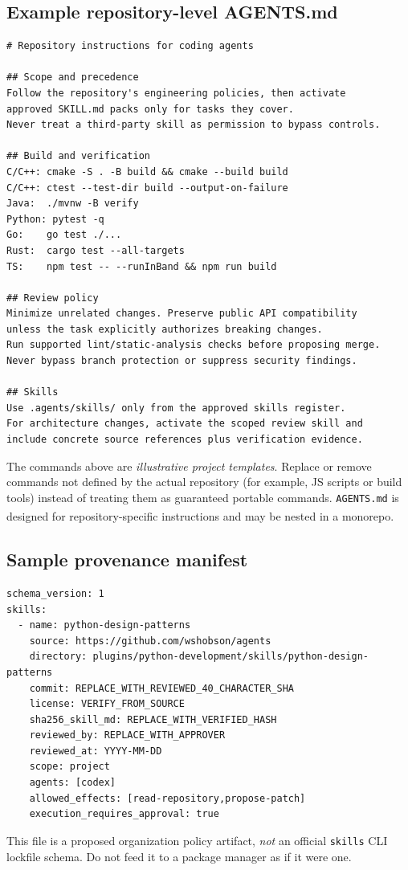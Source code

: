 \documentclass[11pt,letterpaper]{article}
\newcommand{\src}[1]{\textsuperscript{\textcolor{teal}{\cite{#1}}}}
\begin{document}
\subsection{Example repository-level AGENTS.md}
\begin{verbatim}
# Repository instructions for coding agents

## Scope and precedence
Follow the repository's engineering policies, then activate
approved SKILL.md packs only for tasks they cover.
Never treat a third-party skill as permission to bypass controls.

## Build and verification
C/C++: cmake -S . -B build && cmake --build build
C/C++: ctest --test-dir build --output-on-failure
Java:  ./mvnw -B verify
Python: pytest -q
Go:    go test ./...
Rust:  cargo test --all-targets
TS:    npm test -- --runInBand && npm run build

## Review policy
Minimize unrelated changes. Preserve public API compatibility
unless the task explicitly authorizes breaking changes.
Run supported lint/static-analysis checks before proposing merge.
Never bypass branch protection or suppress security findings.

## Skills
Use .agents/skills/ only from the approved skills register.
For architecture changes, activate the scoped review skill and
include concrete source references plus verification evidence.
\end{verbatim}
The commands above are \emph{illustrative project templates}. Replace or remove commands not defined by the actual repository (for example, JS scripts or build tools) instead of treating them as guaranteed portable commands. \texttt{AGENTS.md} is designed for repository-specific instructions and may be nested in a monorepo.\src{agentsmd}

\subsection{Sample provenance manifest}
\begin{verbatim}
schema_version: 1
skills:
  - name: python-design-patterns
    source: https://github.com/wshobson/agents
    directory: plugins/python-development/skills/python-design-patterns
    commit: REPLACE_WITH_REVIEWED_40_CHARACTER_SHA
    license: VERIFY_FROM_SOURCE
    sha256_skill_md: REPLACE_WITH_VERIFIED_HASH
    reviewed_by: REPLACE_WITH_APPROVER
    reviewed_at: YYYY-MM-DD
    scope: project
    agents: [codex]
    allowed_effects: [read-repository,propose-patch]
    execution_requires_approval: true
\end{verbatim}
This file is a proposed organization policy artifact, \emph{not} an official \texttt{skills} CLI lockfile schema. Do not feed it to a package manager as if it were one.
\end{document}
